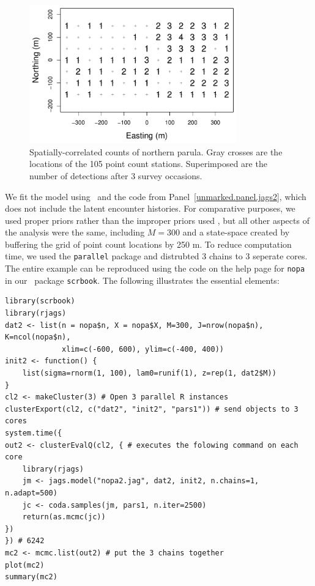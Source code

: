 \begin{figure}
  \centering
  \includegraphics[width=0.8\textwidth]{Ch18-Unmarked/figs/nopaCounts}
  \caption{Spatially-correlated counts of northern parula. Gray
    crosses are the locations of the 105 point count
    stations. Superimposed are the number of detections after 3 survey occasions.}
  \label{fig:nopaDat}
\end{figure}

We fit the model using \jags~and the code from
Panel~\ref{unmarked.panel.jags2}, which does not include the latent
encounter histories. For comparative purposes, we used proper priors
rather than the improper priors used \citet{chandler_royle:2012}, but
all other aspects of the analysis were the same, including $M=300$ and
a state-space created by buffering the grid of point count
locations by 250 m.
To reduce computation time, we used the \texttt{parallel} package and
distrubted 3 chains to 3 seperate cores. The entire example can be
reproduced using the code on the help page for \verb+nopa+ in our
\R~package \texttt{scrbook}. The following illustrates the essential
elements:
\begin{small}
\begin{verbatim}
library(scrbook)
library(rjags)
dat2 <- list(n = nopa$n, X = nopa$X, M=300, J=nrow(nopa$n), K=ncol(nopa$n),
             xlim=c(-600, 600), ylim=c(-400, 400))
init2 <- function() {
    list(sigma=rnorm(1, 100), lam0=runif(1), z=rep(1, dat2$M))
}
cl2 <- makeCluster(3) # Open 3 parallel R instances
clusterExport(cl2, c("dat2", "init2", "pars1")) # send objects to 3 cores
system.time({
out2 <- clusterEvalQ(cl2, { # executes the folowing command on each core
    library(rjags)
    jm <- jags.model("nopa2.jag", dat2, init2, n.chains=1, n.adapt=500)
    jc <- coda.samples(jm, pars1, n.iter=2500)
    return(as.mcmc(jc))
})
}) # 6242
mc2 <- mcmc.list(out2) # put the 3 chains together
plot(mc2)
summary(mc2)
\end{verbatim}
\end{small}


